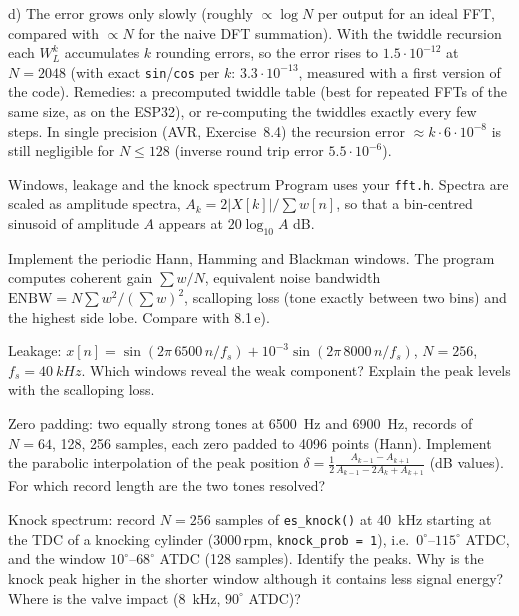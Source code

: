 \begin{solution}
d) The error grows only slowly (roughly $\propto\log N$ per output for an ideal
FFT, compared with $\propto N$ for the naive DFT summation). With the twiddle
recursion each $W_L^k$ accumulates $k$ rounding errors, so the error rises to
$1.5\cdot10^{-12}$ at $N=2048$ (with exact \texttt{sin}/\texttt{cos} per $k$:
$3.3\cdot10^{-13}$, measured with a first version of the code). Remedies: a
precomputed twiddle table (best for repeated FFTs of the same size, as on the
ESP32), or re-computing the twiddles exactly every few steps. In single
precision (AVR, Exercise~8.4) the recursion error $\approx k\cdot6\cdot10^{-8}$ is
still negligible for $N\le128$ (inverse round trip error $5.5\cdot10^{-6}$).
\end{solution}

\begin{exercise}{Windows, leakage and the knock spectrum}{\JSLinux}
Program  uses your \texttt{fft.h}.
Spectra are scaled as amplitude spectra, $A_k=2|X[k]|/\sum w[n]$, so that a
bin-centred sinusoid of amplitude $A$ appears at $20\log_{10}A$ dB.
\begin{tasks}
  \item Implement the periodic Hann, Hamming and Blackman windows. The program
    computes coherent gain $\sum w/N$, equivalent noise bandwidth
    $\mathrm{ENBW}=N\sum w^2/(\sum w)^2$, scalloping loss (tone exactly
    between two bins) and the highest side lobe. Compare with 8.1\,e).
  \item Leakage: $x[n]=\sin(2\pi\,6500\,n/f_s)+10^{-3}\sin(2\pi\,8000\,n/f_s)$,
    $N=256$, $f_s=\SI{40}{kHz}$. Which windows reveal the weak component?
    Explain the peak levels with the scalloping loss.
  \item Zero padding: two equally strong tones at \SI{6500}{Hz} and
    \SI{6900}{Hz}, records of $N=64$, 128, 256 samples, each zero padded to 4096
    points (Hann). Implement the parabolic interpolation of the peak position
    $\delta=\frac12\frac{A_{k-1}-A_{k+1}}{A_{k-1}-2A_k+A_{k+1}}$ (dB values).
    For which record length are the two tones resolved?
  \item Knock spectrum: record $N=256$ samples of \texttt{es\_knock()} at
    \SI{40}{kHz} starting at the TDC of a knocking cylinder (3000\,rpm,
    \texttt{knock\_prob = 1}), i.e.\ $0^\circ$--$115^\circ$ ATDC, and the window
    $10^\circ$--$68^\circ$ ATDC (128 samples). Identify the peaks. Why is the
    knock peak higher in the shorter window although it contains less signal
    energy? Where is the valve impact (\SI{8}{kHz}, $90^\circ$ ATDC)?
\end{tasks}
\end{exercise}

